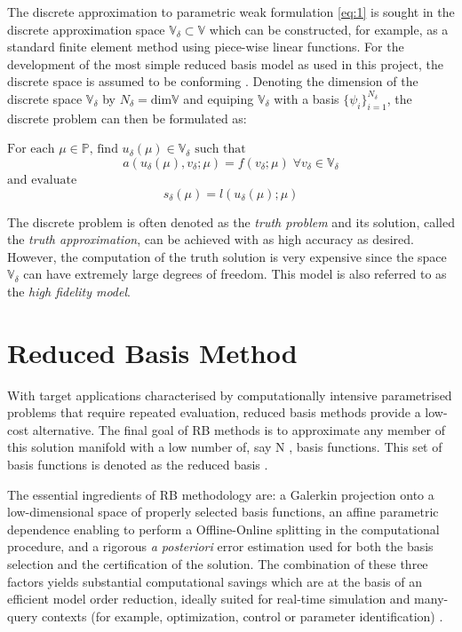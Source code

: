 \documentclass[11pt, oneside]{article}
\begin{document}
The discrete approximation to parametric weak formulation \ref{eq:1} is sought in the discrete approximation space $\mathbb{V}_{\delta} \subset \mathbb{V}$ which can be constructed, for example, as a standard finite element method using piece-wise linear functions. For the development of the most simple reduced basis model as used in this project, the discrete space is assumed to be conforming \cite{HesthavenRozzaStamm2015}. Denoting the dimension of the discrete space $\mathbb{V}_{\delta}$ by $N_{\delta} = \text{dim}{\mathbb{V}}$ and equiping $\mathbb{V}_{\delta}$ with a basis $\{\psi_i\}_{i=1}^{N_\delta}$, the discrete problem can then be formulated as:

$\text{For each } \mu \in \mathbb{P} \text{, find } u_{\delta}(\mu) \in \mathbb{V}_{\delta} \text{ such that }$
\begin{equation}\label{eq:3}
  a(u_{\delta}(\mu), v_{\delta}; \mu) = f(v_{\delta};\mu)  \mspace{5mu} \forall v_{\delta} \in \mathbb{V_{\delta}}
\end{equation}
$\text{and evaluate}$
\begin{equation}\label{eq:4}
  s_{\delta}(\mu) = l(u_{\delta}(\mu);\mu)
\end{equation}

The discrete problem is often denoted as the \textit{truth problem} and its solution, called the \textit{truth approximation}, can be achieved with as high accuracy as desired. However, the computation of the truth solution is very expensive since the space $\mathbb{V}_{\delta}$ can have extremely large degrees of freedom. This model is also referred to as the \textit{high fidelity model}.

\section{Reduced Basis Method}
With target applications characterised by computationally intensive parametrised problems that require repeated evaluation, reduced basis methods provide a low-cost alternative. The final goal of RB methods is to approximate any member of this solution manifold with a low number of, say N , basis functions. This set of basis functions is denoted as the reduced basis \cite{HesthavenRozzaStamm2015}.

The essential ingredients of RB methodology are: a Galerkin projection onto a low-dimensional space of properly selected basis functions, an affine parametric dependence enabling to perform a Offline-Online splitting in the computational procedure, and a rigorous \textit{a posteriori} error estimation used for both the basis selection and the certification of the solution. The combination of these three factors yields substantial computational savings which are at the basis of an efficient model order reduction, ideally suited for real-time simulation and many-query contexts (for example, optimization, control or parameter identification) \cite{quarteroni2011}.
\end{document}
